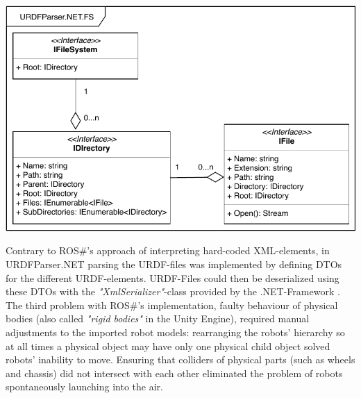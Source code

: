 \begin{center}
    \noindent
    \includegraphics[width=14cm]{img/ch05/URDFParser_FileSystemInterfaces.pdf}
    \label{fig:filesystem}
\end{center}
Contrary to ROS\#'s approach of interpreting hard-coded XML-elements, in URDFParser.NET parsing the URDF-files was implemented by defining \acp{DTO} for the different URDF-elements. URDF-Files could then be deserialized using these \acsp{DTO} with the \emph{"XmlSerializer"}-class provided by the .NET-Framework \cite{XmlSerializer}.\\
The third problem with ROS\#'s implementation, faulty behaviour of physical bodies (also called \emph{"rigid bodies"} in the Unity Engine), required manual adjustments to the imported robot models: rearranging the robots' hierarchy so at all times a physical object may have only one physical child object solved robots' inability to move. Ensuring that colliders of physical parts (such as wheels and chassis) did not intersect with each other eliminated the problem of robots spontaneously launching into the air. 

